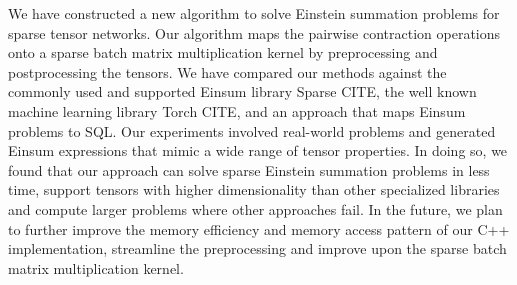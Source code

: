 We have constructed a new algorithm to solve Einstein summation problems for sparse tensor networks.
Our algorithm maps the pairwise contraction operations onto a sparse batch matrix multiplication kernel
by preprocessing and postprocessing the tensors. We have compared our methods against the commonly used
and supported Einsum library Sparse CITE, the well known machine learning library Torch CITE, and an
approach that maps Einsum problems to SQL. Our experiments involved real-world problems and generated
Einsum expressions that mimic a wide range of tensor properties. In doing so, we found that our approach
can solve sparse Einstein summation problems in less time, support tensors with higher dimensionality
than other specialized libraries and compute larger problems where other approaches fail. In the future,
we plan to further improve the memory efficiency and memory access pattern of our C++ implementation,
streamline the preprocessing and improve upon the sparse batch matrix multiplication kernel.